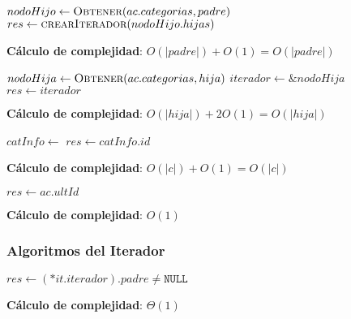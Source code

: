 \documentclass[10pt, a4paper]{article}
\let\TipoVariable=\texttt
\let\ModificadorArgumento=\textbf
\newcommand{\In}[2]{\ModificadorArgumento{in} \ensuremath{#1}\,: \TipoVariable{#2}\xspace}
\newcommand{\DRef}{\ensuremath{\rightarrow}}
\begin{document}
\begin{algorithm}[H]
\caption*{iHijas(\In{ac}{abCat}, \In{padre}{categoria}) $\DRef res$ : \TipoVariable{iteradorUni(categoria)}}
\begin{algorithmic}[1]
    \State $nodoHijo \gets \Call{Obtener}{ac.categorias, padre}$
	\State $res \gets \Call{crearIterador}{nodoHijo.hijas}$
\end{algorithmic}
\textbf{C\'alculo de complejidad}: $O(|padre|) + O(1) = O(|padre|)$
\end{algorithm}

\begin{algorithm}[H]
\caption*{iPadres(\In{ac}{abCat}, \In{hija}{categoria}) $\DRef res$ : \TipoVariable{itAbCat}}
\begin{algorithmic}[1]
    \State $nodoHija \gets \Call{Obtener}{ac.categorias, hija}$
    \State $iterador \gets \&nodoHija$
    \State $res \gets iterador$
\end{algorithmic}
\textbf{C\'alculo de complejidad}: $O(|hija|) + 2O(1) = O(|hija|)$
\end{algorithm}

\begin{algorithm}[H]
\caption*{iID(\In{ac}{abCat}, \In{c}{categoria}) $\DRef res$ : \TipoVariable{Nat}}
\begin{algorithmic}[1]
	\State $catInfo \gets$ 
	\State $res \gets catInfo.id$
\end{algorithmic}
\textbf{C\'alculo de complejidad}: $O(|c|) + O(1) = O(|c|)$
\end{algorithm}

\begin{algorithm}[H]
\caption*{iCantCategorias(\In{ac}{abCat}) $\DRef res$ : \TipoVariable{Nat}}
\begin{algorithmic}[1]
	\State $res \gets ac.ultId$
\end{algorithmic}
\textbf{C\'alculo de complejidad}: $O(1)$
\end{algorithm}

\subsubsection{Algoritmos del Iterador}

\begin{algorithm}[H]
\caption*{iHayMasPadres?(\In{it}{itAbCat}) $\DRef res$ : \TipoVariable{Bool}}
\begin{algorithmic}[1]
	\State $res \gets (*it.iterador).padre \neq \TipoVariable{NULL}$
\end{algorithmic}
	\textbf{C\'alculo de complejidad}: $\Theta(1)$
\end{algorithm}
\end{document}
